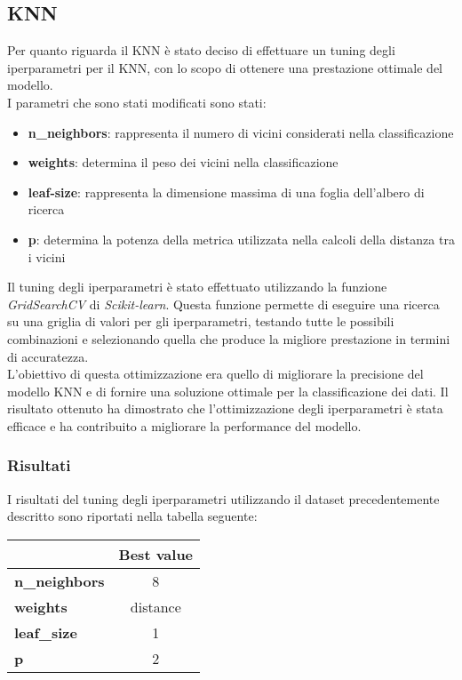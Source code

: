 \documentclass[../../Report.tex]{subfiles}
\begin{document}
\subsection{KNN}
Per quanto riguarda il KNN è stato deciso di effettuare un tuning degli iperparametri per il KNN, con lo scopo di ottenere una prestazione ottimale del modello.\\
I parametri che sono stati modificati sono stati:
\begin{itemize}
    \item \textbf{n\_neighbors}: rappresenta il numero di vicini considerati nella classificazione
    \item \textbf{weights}: determina il peso dei vicini nella classificazione
    \item \textbf{leaf-size}: rappresenta la dimensione massima di una foglia dell'albero di ricerca
    \item \textbf{p}: determina la potenza della metrica utilizzata nella calcoli della distanza tra i vicini
\end{itemize}
Il tuning degli iperparametri è stato effettuato utilizzando la funzione \emph{GridSearchCV} di \emph{Scikit-learn}. Questa funzione permette di eseguire una ricerca su una griglia di valori per gli iperparametri, testando tutte le possibili combinazioni e selezionando quella che produce la migliore prestazione in termini di accuratezza.\\
L'obiettivo di questa ottimizzazione era quello di migliorare la precisione del modello KNN e di fornire una soluzione ottimale per la classificazione dei dati. Il risultato ottenuto ha dimostrato che l'ottimizzazione degli iperparametri è stata efficace e ha contribuito a migliorare la performance del modello.

\subsubsection{Risultati}
I risultati del tuning degli iperparametri utilizzando il dataset precedentemente descritto sono riportati nella tabella seguente:

\begin{table}[H]
    \centering
    \begin{tabular}{|l|c|}
        \hline
         & \textbf{Best value} \\
        \hline
        \textbf{n\_neighbors} & 8 \\
        \hline
        \textbf{weights} & distance \\
        \hline
        \textbf{leaf\_size} & 1 \\
        \hline
        \textbf{p} & 2 \\
        \hline
    \end{tabular}
\end{table}
\end{document}
